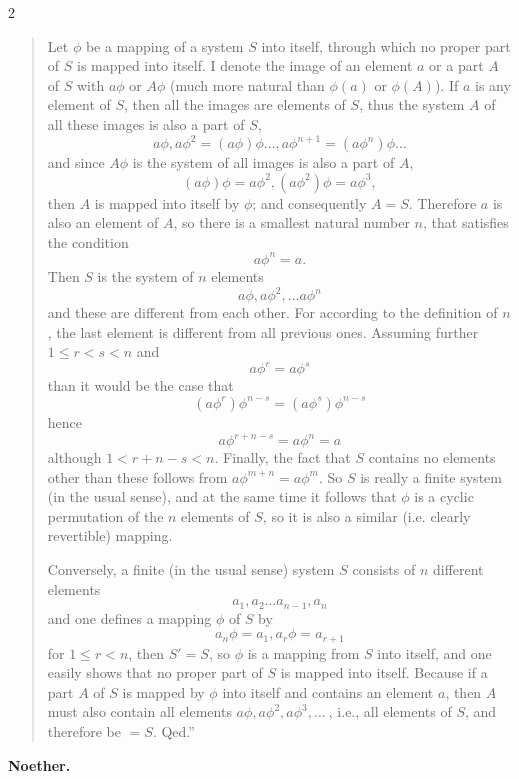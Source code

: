 \documentclass[leqno,hidelinks,10pt]{article}
\theoremstyle{definition}
\begin{document}
\begin{paracol}{2}
\begin{rightcolumn}
\begin{quote}
\hspace{12pt} Let $\phi$ be a mapping of a system $S$ into itself, through which
no proper part of $S$ is mapped into itself. I denote the image of an element $a$
or a part $A$ of $S$ with $a\phi$ or $A\phi$ (much more natural than $\phi(a)$
or $\phi(A)$). If $a$ is any element of $S$, then all the images are elements of
$S$, thus the system $A$ of all these images is also a part of $S$,
\vspace{16pt}
\[
	a\phi, a\phi^2= (a\phi)\phi \ldots, a\phi^{n+1} = (a\phi^n)\phi \ldots
\]
and since $A\phi$ is the system of all images is also a part of $A$,
\[
	(a\phi) \phi = a\phi^2, (a\phi^2)\phi = a\phi^3,
\]
then $A$ is mapped into itself by $\phi$; and consequently $A = S$. Therefore $a$
is also an element of $A$, so there is a smallest natural number $n$, that
satisfies the condition
\[
	a\phi^n = a.
\]
Then $S$ is the system of $n$ elements
\[
	a\phi,a\phi^2,\ldots a\phi^n
\]
and these are different from each other.
For according to the definition of $n$, the last element is different from all
previous ones. Assuming further $1 \leq r<s < n$ and
\[
	a\phi^r = a\phi^s
\]
than it would be the case that
\[
	(a\phi^r)\phi^{n-s} = (a\phi^s) \phi^{n-s}
\]
hence
\[
	a\phi^{r+n-s} = a\phi^n=a
\]
although $1<r+n-s<n$.
Finally, the fact that $S$ contains no elements other than these follows from
$a\phi^{m + n} = a\phi^m$. So $S$ is really a finite system (in the usual sense),
and at the same time it follows that $\phi$ is a cyclic permutation of the $n$
elements of $S$, so it is also a similar (i.e. clearly revertible) mapping.

\hspace{12pt} Conversely, a finite (in the usual sense) system $S$ consists of
$n$ different elements
\[
	a_1, a_2 \ldots a_{n-1}, a_n
\]
and one defines a mapping $\phi$ of $S$ by
\[
a_n\phi = a_1, a_r\phi=a_{r+1}
\]
for $1\leq r<n$, then $S' = S$, so $\phi$ is a mapping from $S$ into itself, and
one easily shows that no proper part of $S$ is mapped into itself. Because if
a part $A$ of $S$ is mapped by $\phi$ into itself and contains an element $a$,
then $A$ must also contain all elements $a\phi, a\phi^2, a\phi^3, \ldots \ $, i.e.,
all elements of $S$, and therefore be $= S$. Qed.''
\end{quote}
\begin{flushright}\textbf{Noether.}\end{flushright}

\end{rightcolumn}
\end{paracol}
\restoregeometry
\end{document}
